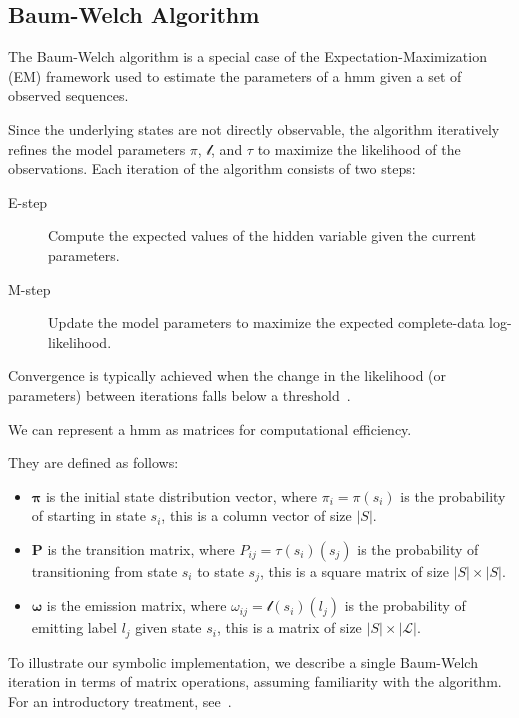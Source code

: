 \subsection{Baum-Welch Algorithm}\label{subsec:baum-welch}
The Baum-Welch algorithm is a special case of the Expectation-Maximization (EM) framework used to estimate the parameters of a \gls{hmm} given a set of observed sequences.

Since the underlying states are not directly observable, the algorithm iteratively refines the model parameters $\pi$, $\mathscr{l}$, and $\tau$ to maximize the likelihood of the observations.
Each iteration of the algorithm consists of two steps:


\begin{description}
    \item[E-step] Compute the expected values of the hidden variable given the current parameters.
    \item[M-step] Update the model parameters to maximize the expected complete-data log-likelihood.
\end{description}


Convergence is typically achieved when the change in the likelihood (or parameters) between iterations falls below a threshold~\cite{Rabiner89}.

We can represent a \gls{hmm} as matrices for computational efficiency.

They are defined as follows:


\begin{itemize}
    \item $\pmb{\pi}$ is the initial state distribution vector, where $\pi_i = \pi(s_i)$ is the probability of starting in state $s_i$, this is a column vector of size $|S|$.
    \item $\pmb{P}$ is the transition matrix, where $P_{ij} = \tau(s_i)(s_j)$ is the probability of transitioning from state $s_i$ to state $s_j$, this is a square matrix of size $|S| \times |S|$.
    \item $\pmb{\omega}$ is the emission matrix, where $\omega_{ij} = \mathscr{l}(s_i)(l_j)$ is the probability of emitting label $l_j$ given state $s_i$, this is a matrix of size $|S| \times |\mathcal{L}|$.
\end{itemize}


To illustrate our symbolic implementation, we describe a single Baum-Welch iteration in terms of matrix operations, assuming familiarity with the algorithm. For an introductory treatment, see~\cite{Baum70,reynouard2024learning}.


